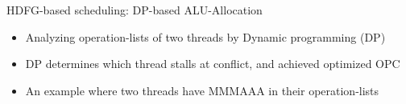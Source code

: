 \documentclass{beamer}
\begin{document}
\begin{CJK}{UTF8}{bkai}
    \begin{frame}{HDFG-based scheduling: DP-based ALU-Allocation}
        \begin{itemize}
            \item Analyzing operation-lists of two threads by Dynamic programming (DP)
            \item DP determines which thread stalls at conflict, and achieved optimized OPC
            \item An example where two threads have MMMAAA in their operation-lists
        \end{itemize}
        \begin{figure}[!ht]
            \begin{center}
                \hfill
                \hfill
            \end{center}
            \label{fig:alloc}
        \end{figure}
    \end{frame}


\end{CJK}
\end{document}
